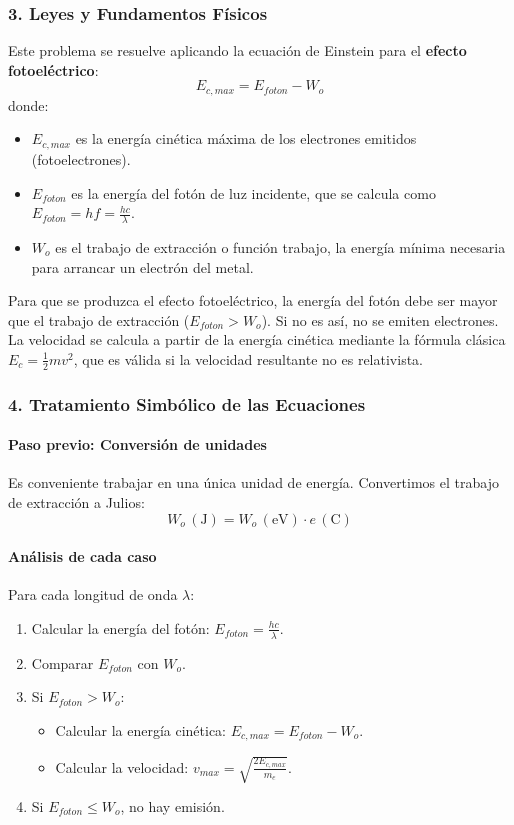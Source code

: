 \subsubsection*{3. Leyes y Fundamentos Físicos}
Este problema se resuelve aplicando la ecuación de Einstein para el \textbf{efecto fotoeléctrico}:
$$ E_{c,max} = E_{foton} - W_o $$
donde:
\begin{itemize}
    \item $E_{c,max}$ es la energía cinética máxima de los electrones emitidos (fotoelectrones).
    \item $E_{foton}$ es la energía del fotón de luz incidente, que se calcula como $E_{foton} = hf = \frac{hc}{\lambda}$.
    \item $W_o$ es el trabajo de extracción o función trabajo, la energía mínima necesaria para arrancar un electrón del metal.
\end{itemize}
Para que se produzca el efecto fotoeléctrico, la energía del fotón debe ser mayor que el trabajo de extracción ($E_{foton} > W_o$). Si no es así, no se emiten electrones.
La velocidad se calcula a partir de la energía cinética mediante la fórmula clásica $E_c = \frac{1}{2}mv^2$, que es válida si la velocidad resultante no es relativista.

\subsubsection*{4. Tratamiento Simbólico de las Ecuaciones}
\paragraph{Paso previo: Conversión de unidades}
Es conveniente trabajar en una única unidad de energía. Convertimos el trabajo de extracción a Julios:
$$ W_o \, (\text{J}) = W_o \, (\text{eV}) \cdot e \, (\text{C}) $$
\paragraph{Análisis de cada caso}
Para cada longitud de onda $\lambda$:
\begin{enumerate}
    \item Calcular la energía del fotón: $E_{foton} = \frac{hc}{\lambda}$.
    \item Comparar $E_{foton}$ con $W_o$.
    \item Si $E_{foton} > W_o$:
        \begin{itemize}
            \item Calcular la energía cinética: $E_{c,max} = E_{foton} - W_o$.
            \item Calcular la velocidad: $v_{max} = \sqrt{\frac{2E_{c,max}}{m_e}}$.
        \end{itemize}
    \item Si $E_{foton} \le W_o$, no hay emisión.
\end{enumerate}

